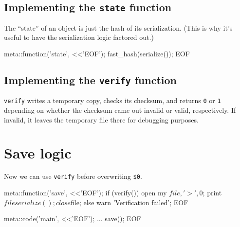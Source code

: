 \documentclass{report}
\begin{document}
\subsection{Implementing the {\tt state} function}\label{sec:serialization-verifying-state-function}
      The ``state'' of an object is just the hash of its serialization. (This is why it's useful to have the serialization logic factored out.)

\begin{perlcode}
meta::function('state', <<'EOF');
fast_hash(serialize());
EOF \end{perlcode}

\subsection{Implementing the {\tt verify} function}\label{sec:serialization-verifying-verify-function}
      {\tt verify} writes a temporary copy, checks its checksum, and returns {\tt 0} or {\tt 1} depending on whether the checksum came out invalid or valid, respectively. If invalid, it leaves
      the temporary file there for debugging purposes.


\section{Save logic}\label{sec:serialization-save-logic}
    Now we can use {\tt verify} before overwriting \verb|$0|.

\begin{perlcode}
meta::function('save', <<'EOF');
if (verify()) {
  open my $file, '>', $0;
  print $file serialize();
  close $file;
} else {
  warn 'Verification failed';
}
EOF

meta::code('main', <<'EOF');
...
save();
EOF \end{perlcode}
\end{document}
